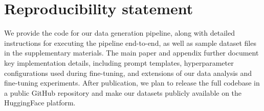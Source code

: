 \section{Reproducibility statement}


We provide the code for our data generation pipeline, along with detailed instructions for executing the pipeline end-to-end, as well as sample dataset files in the supplementary materials. The main paper and appendix further document key implementation details, including prompt templates, hyperparameter configurations used during fine-tuning, and extensions of our data analysis and fine-tuning experiments. After publication, we plan to release the full codebase in a public GitHub repository and make our datasets publicly available on the HuggingFace platform.